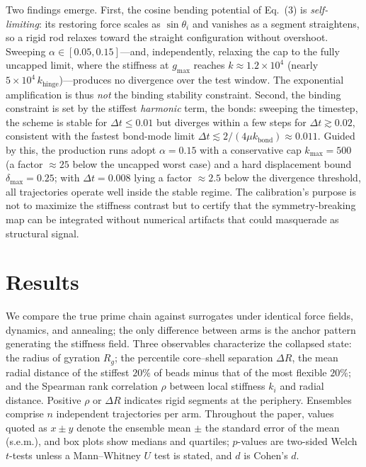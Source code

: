 \documentclass[11pt]{article}
\begin{document}
Two findings emerge. First, the cosine bending potential of Eq.~(3) is
\emph{self-limiting}: its restoring force scales as $\sin\theta_i$ and vanishes as a
segment straightens, so a rigid rod relaxes toward the straight configuration
without overshoot. Sweeping $\alpha \in [0.05, 0.15]$---and, independently, relaxing
the cap to the fully uncapped limit, where the stiffness at $g_{\max}$ reaches
$k \approx 1.2 \times 10^{4}$ (nearly $5 \times 10^{4}\,k_{\text{hinge}}$)---produces
no divergence over the test window. The exponential amplification is thus \emph{not}
the binding stability constraint. Second, the binding constraint is set by the
stiffest \emph{harmonic} term, the bonds: sweeping the timestep, the scheme is stable
for $\Delta t \le 0.01$ but diverges within a few steps for $\Delta t \gtrsim 0.02$,
consistent with the fastest bond-mode limit $\Delta t \lesssim 2/(4\mu k_{\text{bond}})
\approx 0.011$. Guided by this, the production runs adopt $\alpha = 0.15$ with a
conservative cap $k_{\max} = 500$ (a factor $\approx 25$ below the uncapped worst case)
and a hard displacement bound $\delta_{\max} = 0.25$; with $\Delta t = 0.008$ lying a
factor $\approx 2.5$ below the divergence threshold, all trajectories operate well
inside the stable regime. The calibration's purpose is not to maximize the stiffness
contrast but to certify that the symmetry-breaking map can be integrated without
numerical artifacts that could masquerade as structural signal.

\section{Results}

We compare the true prime chain against surrogates under identical force fields,
dynamics, and annealing; the only difference between arms is the anchor pattern
generating the stiffness field. Three observables characterize the collapsed state:
the radius of gyration $R_g$; the percentile core--shell separation $\Delta R$, the
mean radial distance of the stiffest $20\%$ of beads minus that of the most flexible
$20\%$; and the Spearman rank correlation $\rho$ between local stiffness $k_i$ and
radial distance. Positive $\rho$ or $\Delta R$ indicates rigid segments at the
periphery. Ensembles comprise $n$ independent trajectories per arm. Throughout the
paper, values quoted as $x \pm y$ denote the ensemble mean $\pm$ the standard error
of the mean (s.e.m.), and box plots show medians and quartiles; $p$-values are
two-sided Welch $t$-tests unless a Mann--Whitney $U$ test is stated, and $d$ is
Cohen's $d$.
\end{document}
